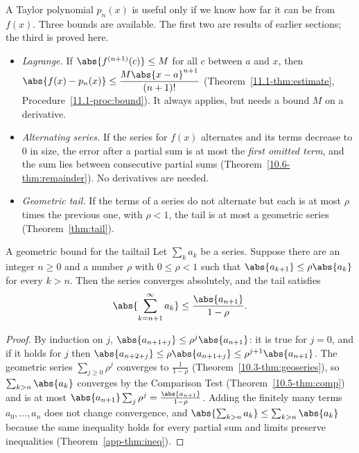\documentclass[11pt]{article}
\begin{document}
A Taylor polynomial $p_n(x)$ is useful only if we know how far it can be from $f(x)$. Three bounds are available. The first two are results of earlier sections; the third is proved here.
\begin{itemize}
  \item \emph{Lagrange.} If $\abs{f^{(n+1)}(c)}\le M$ for all $c$ between $a$ and $x$, then $\abs{f(x)-p_n(x)}\le\dfrac{M\abs{x-a}^{n+1}}{(n+1)!}$ (Theorem~\ref{11.1-thm:estimate}, Procedure~\ref{11.1-proc:bound}). It always applies, but needs a bound $M$ on a derivative.
  \item \emph{Alternating series.} If the series for $f(x)$ alternates and its terms decrease to $0$ in size, the error after a partial sum is at most the \emph{first omitted term}, and the sum lies between consecutive partial sums (Theorem~\ref{10.6-thm:remainder}). No derivatives are needed.
  \item \emph{Geometric tail.} If the terms of a series do not alternate but each is at most $\rho$ times the previous one, with $\rho<1$, the tail is at most a geometric series (Theorem~\ref{thm:tail}).
\end{itemize}

\begin{thm}{A geometric bound for the tail}{tail}
Let $\sum_{k}a_k$ be a series. Suppose there are an integer $n\ge0$ and a number $\rho$ with $0\le\rho<1$ such that $\abs{a_{k+1}}\le\rho\abs{a_k}$ for every $k>n$. Then the series converges absolutely, and the tail satisfies
\[
\abs{\sum_{k=n+1}^\infty a_k}\le\frac{\abs{a_{n+1}}}{1-\rho}.
\]
\end{thm}
\begin{proof}
By induction on $j$, $\abs{a_{n+1+j}}\le\rho^j\abs{a_{n+1}}$: it is true for $j=0$, and if it holds for $j$ then $\abs{a_{n+2+j}}\le\rho\abs{a_{n+1+j}}\le\rho^{j+1}\abs{a_{n+1}}$. The geometric series $\sum_{j\ge0}\rho^j$ converges to $\frac1{1-\rho}$ (Theorem~\ref{10.3-thm:geoseries}), so $\sum_{k>n}\abs{a_k}$ converges by the Comparison Test (Theorem~\ref{10.5-thm:comp}) and is at most $\abs{a_{n+1}}\sum_j\rho^j=\frac{\abs{a_{n+1}}}{1-\rho}$. Adding the finitely many terms $a_0,\dots,a_n$ does not change convergence, and $\abs{\sum_{k>n}a_k}\le\sum_{k>n}\abs{a_k}$ because the same inequality holds for every partial sum and limits preserve inequalities (Theorem~\ref{app-thm:ineq}).
\end{proof}
\end{document}
